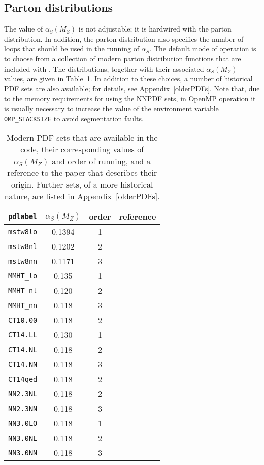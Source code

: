 \documentclass{article}
\begin{document}
\subsection{Parton distributions}
The value of $\alpha_S(M_Z)$ is not adjustable; it is hardwired with the
parton distribution. In addition, the parton distribution also specifies
the number of loops that should be used in the running of $\alpha_S$.
The default mode of operation is to choose from a
collection of modern parton distribution functions that are included with
\MCFM.  The distributions, together with their associated $\alpha_S(M_Z)$
values, are given in Table~\ref{pdlabelrecent}.   In addition to these
choices, a number of historical PDF sets are also available;  for details, see
Appendix~\ref{olderPDFs}.  Note that, due to the memory requirements for
using the NNPDF sets, in OpenMP operation it is usually necessary to increase
the value of the environment variable {\tt OMP\_STACKSIZE} to avoid
segmentation faults.
%
\begin{table}[h]
\begin{center}
\begin{tabular}{|c|c|c|c|}
\hline
{\tt pdlabel}  & $\alpha_S(M_Z)$ & order & reference \\
\hline
{\tt mstw8lo}  & 0.1394 & 1     & \cite{Martin:2009iq} \\
{\tt mstw8nl}  & 0.1202 & 2     & \cite{Martin:2009iq} \\
{\tt mstw8nn}  & 0.1171 & 3     & \cite{Martin:2009iq} \\
{\tt MMHT\_lo}  & 0.135  & 1     & \cite{Harland-Lang:2014zoa} \\
{\tt MMHT\_nl}  & 0.120  & 2     & \cite{Harland-Lang:2014zoa} \\
{\tt MMHT\_nn}  & 0.118  & 3     & \cite{Harland-Lang:2014zoa} \\
\hline
{\tt CT10.00}  & 0.118  & 2     & \cite{Lai:2010vv} \\
{\tt CT14.LL}  & 0.130  & 1     & \cite{Dulat:2015mca} \\
{\tt CT14.NL}  & 0.118  & 2     & \cite{Dulat:2015mca} \\
{\tt CT14.NN}  & 0.118  & 3     & \cite{Dulat:2015mca} \\
{\tt CT14qed}  & 0.118  & 2     & \cite{Schmidt:2015zda} \\
\hline
{\tt NN2.3NL}  & 0.118  & 2     & \cite{Ball:2012cx} \\
{\tt NN2.3NN}  & 0.118  & 3     & \cite{Ball:2012cx} \\
{\tt NN3.0LO}  & 0.118  & 1     & \cite{Ball:2014uwa} \\
{\tt NN3.0NL}  & 0.118  & 2     & \cite{Ball:2014uwa} \\
{\tt NN3.0NN}  & 0.118  & 3     & \cite{Ball:2014uwa} \\
\hline
\end{tabular}
\end{center}
\caption{Modern PDF sets that are available in the code,
their corresponding values of $\alpha_S(M_Z)$ and order of running,
and a reference to the paper
that describes their origin.  Further sets, of a more historical nature, are
listed in Appendix~\ref{olderPDFs}.
\label{pdlabelrecent}}
\end{table}
\end{document}
